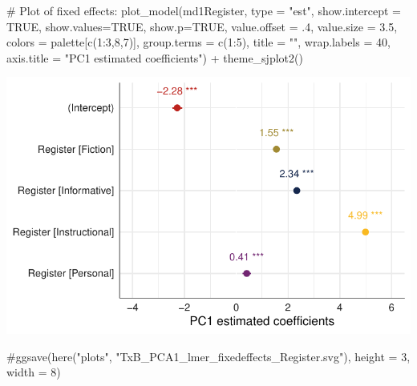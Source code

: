 \documentclass[
  letterpaper,
  DIV=11,
  numbers=noendperiod]{scrreprt}
\newenvironment{Shaded}{\begin{snugshade}}{\end{snugshade}}
\newcommand{\AttributeTok}[1]{\textcolor[rgb]{0.40,0.45,0.13}{#1}}
\newcommand{\CommentTok}[1]{\textcolor[rgb]{0.37,0.37,0.37}{#1}}
\newcommand{\ConstantTok}[1]{\textcolor[rgb]{0.56,0.35,0.01}{#1}}
\newcommand{\DecValTok}[1]{\textcolor[rgb]{0.68,0.00,0.00}{#1}}
\newcommand{\FloatTok}[1]{\textcolor[rgb]{0.68,0.00,0.00}{#1}}
\newcommand{\FunctionTok}[1]{\textcolor[rgb]{0.28,0.35,0.67}{#1}}
\newcommand{\NormalTok}[1]{\textcolor[rgb]{0.00,0.23,0.31}{#1}}
\newcommand{\SpecialCharTok}[1]{\textcolor[rgb]{0.37,0.37,0.37}{#1}}
\newcommand{\StringTok}[1]{\textcolor[rgb]{0.13,0.47,0.30}{#1}}
\begin{document}
\begin{Shaded}
\begin{Highlighting}[]
\CommentTok{\# Plot of fixed effects:}
\FunctionTok{plot\_model}\NormalTok{(md1Register, }
           \AttributeTok{type =} \StringTok{"est"}\NormalTok{,}
           \AttributeTok{show.intercept =} \ConstantTok{TRUE}\NormalTok{,}
           \AttributeTok{show.values=}\ConstantTok{TRUE}\NormalTok{, }
           \AttributeTok{show.p=}\ConstantTok{TRUE}\NormalTok{,}
           \AttributeTok{value.offset =}\NormalTok{ .}\DecValTok{4}\NormalTok{,}
           \AttributeTok{value.size =} \FloatTok{3.5}\NormalTok{,}
           \AttributeTok{colors =}\NormalTok{ palette[}\FunctionTok{c}\NormalTok{(}\DecValTok{1}\SpecialCharTok{:}\DecValTok{3}\NormalTok{,}\DecValTok{8}\NormalTok{,}\DecValTok{7}\NormalTok{)],}
           \AttributeTok{group.terms =} \FunctionTok{c}\NormalTok{(}\DecValTok{1}\SpecialCharTok{:}\DecValTok{5}\NormalTok{), }
           \AttributeTok{title =} \StringTok{""}\NormalTok{,}
           \AttributeTok{wrap.labels =} \DecValTok{40}\NormalTok{,}
           \AttributeTok{axis.title =} \StringTok{"PC1 estimated coefficients"}\NormalTok{) }\SpecialCharTok{+}
  \FunctionTok{theme\_sjplot2}\NormalTok{() }
\end{Highlighting}
\end{Shaded}

\includegraphics{AppendixF_files/figure-pdf/Dim1fixed-1.pdf}

\begin{Shaded}
\begin{Highlighting}[]
\CommentTok{\#ggsave(here("plots", "TxB\_PCA1\_lmer\_fixedeffects\_Register.svg"), height = 3, width = 8)}
\end{Highlighting}
\end{Shaded}
\end{document}
